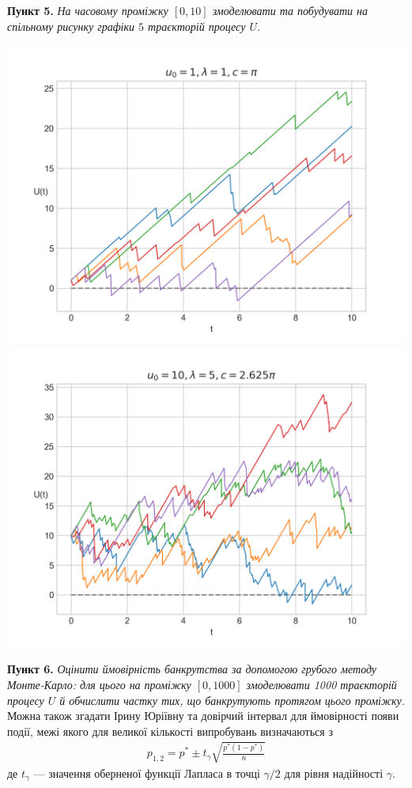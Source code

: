 \documentclass{extreport}
\newcommand{\task}[1]{\vspace{0.5em}\noindent\textbf{#1.}}
\begin{document}
\task{Пункт 5} \emph{На часовому проміжку $[0, 10]$ змоделювати та побудувати на спільному рисунку графіки $5$ траєкторій процесу $U$.}
\begin{center}
    \includegraphics[scale=0.95]{trajectories_1.png} \\
    \includegraphics[scale=0.95]{trajectories_2.png}
\end{center}
\task{Пункт 6} \emph{Оцінити ймовірність банкрутства за допомогою грубого методу Монте-Карло: для цього на проміжку $[0, 1000]$
змоделювати 1000 траєкторій процесу $U$ й обчислити частку тих, що банкрутують протягом цього проміжку.}
Можна також згадати Ірину Юріївну та довірчий інтервал для ймовірності появи події, межі якого для великої кількості випробувань визначаються з 
\begin{gather*}
    p_{1, 2} = p^* \pm t_{\gamma} \sqrt{\frac{p^* \left(1 - p^*\right)}{n}}
\end{gather*}
де $t_{\gamma}$ --- значення оберненої функції Лапласа в точці $\gamma / 2$ для рівня надійності $\gamma$.
\end{document}
